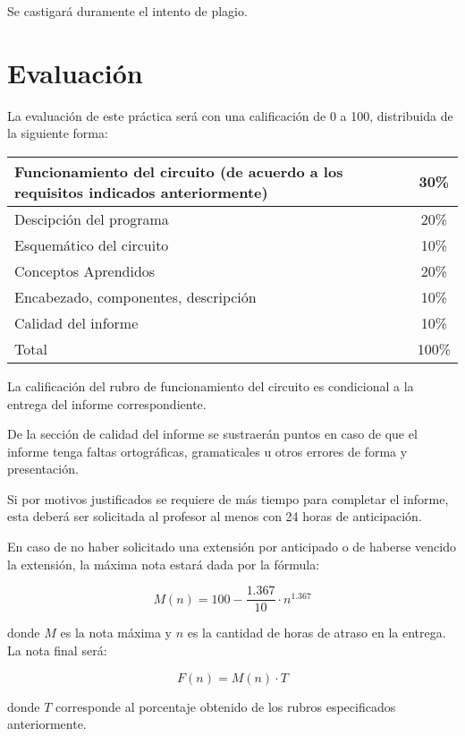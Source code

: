 \documentclass[12pt,letterpaper]{IEEEtran}
\begin{document}
Se castigará duramente el intento de plagio.

\section{Evaluación}

La evaluación de este práctica será con una calificación de 0 a 100, distribuida de la siguiente forma:

\begin{center}
 \begin{tabular}{p{}|c}\hline
   Funcionamiento del circuito (de acuerdo a los requisitos indicados anteriormente) 					     & 30\% \\\hline
   Descipción del programa				& 20\% \\\hline
   Esquemático del circuito				& 10\% \\\hline
   Conceptos Aprendidos					& 20\% \\\hline
   Encabezado, componentes, descripción & 10\% \\\hline
   Calidad del informe					& 10\% \\\hline\hline
   Total								& 100\% \\
 \end{tabular}
\end{center}

La calificación del rubro de funcionamiento del circuito es condicional a la entrega del informe correspondiente.

De la sección de calidad del informe se sustraerán puntos en caso de que el informe tenga faltas ortográficas, gramaticales u otros errores de forma y presentación.

Si por motivos justificados se requiere de más tiempo para completar el informe, esta deberá ser solicitada al profesor al menos con 24 horas de anticipación.

En caso de no haber solicitado una extensión por anticipado o de haberse vencido la extensión, la máxima nota estará dada por la fórmula:

\[ M(n) = 100-\frac{1.367}{10}\cdot n^{1.367} \]

donde $M$ es la nota máxima y $n$ es la cantidad de horas de atraso en la entrega. La nota final será:

\[ F(n) = M(n)\cdot T \]

donde $T$ corresponde al porcentaje obtenido de los rubros especificados anteriormente.
\end{document}
